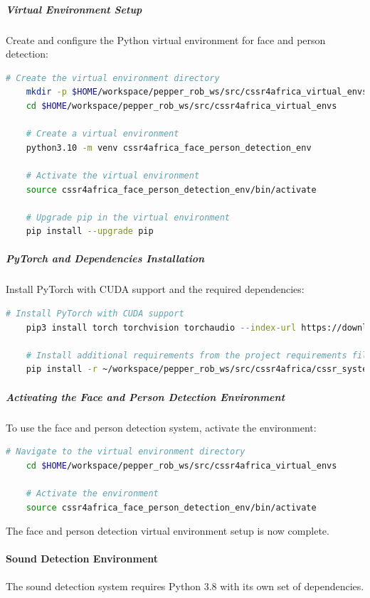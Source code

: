 \documentclass{CSSRforAfrica}
\begin{document}
{\subparagraph{Virtual Environment Setup}
Create and configure the Python virtual environment for face and person detection:
\begin{lstlisting}[style=withoutNumbering, language=bash]
	# Create the virtual environment directory
	mkdir -p $HOME/workspace/pepper_rob_ws/src/cssr4africa_virtual_envs
	cd $HOME/workspace/pepper_rob_ws/src/cssr4africa_virtual_envs
	
	# Create a virtual environment
	python3.10 -m venv cssr4africa_face_person_detection_env
	
	# Activate the virtual environment
	source cssr4africa_face_person_detection_env/bin/activate
	
	# Upgrade pip in the virtual environment
	pip install --upgrade pip
\end{lstlisting}

\subparagraph{PyTorch and Dependencies Installation}
Install PyTorch with CUDA support and the required dependencies:
\begin{lstlisting}[style=withoutNumbering, language=bash]
	# Install PyTorch with CUDA support
	pip3 install torch torchvision torchaudio --index-url https://download.pytorch.org/whl/cu118
	
	# Install additional requirements from the project requirements file
	pip install -r ~/workspace/pepper_rob_ws/src/cssr4africa/cssr_system/face_detection/face_detection_requirements_x86.txt
\end{lstlisting}

\subparagraph{Activating the Face and Person Detection Environment}
To use the face and person detection system, activate the environment:
\begin{lstlisting}[style=withoutNumbering, language=bash]
	# Navigate to the virtual environment directory
	cd $HOME/workspace/pepper_rob_ws/src/cssr4africa_virtual_envs
	
	# Activate the environment
	source cssr4africa_face_person_detection_env/bin/activate
\end{lstlisting}

The face and person detection virtual environment setup is now complete.

\newpage 

\paragraph{Sound Detection Environment}
The sound detection system requires Python 3.8 with its own set of dependencies.

}
\end{document}
